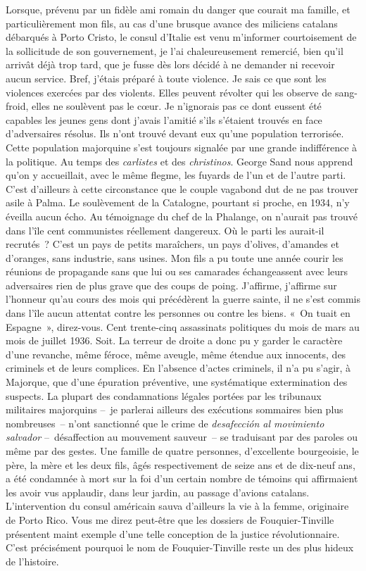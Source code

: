 \documentclass[french,twoside]{book} %
\begin{document}
Lorsque, prévenu par un fidèle ami romain du danger que courait ma famille, et particulièrement mon fils, au cas d’une brusque avance des miliciens catalans débarqués à Porto Cristo, le consul d’Italie est venu m’informer courtoisement de la sollicitude de son gouvernement, je l’ai chaleureusement remercié, bien qu’il arrivât déjà trop tard, que je fusse dès lors décidé à ne demander ni recevoir aucun service. Bref, j’étais préparé à toute violence. Je sais ce que sont les violences exercées par des violents. Elles peuvent révolter qui les observe de sang-froid, elles ne soulèvent pas le cœur. Je n’ignorais pas ce dont eussent été capables les jeunes gens dont j’avais l’amitié s’ils s’étaient trouvés en face d’adversaires résolus. Ils n’ont trouvé devant eux qu’une population terrorisée. Cette population majorquine s’est toujours signalée par une grande indifférence à la politique. Au temps des \emph{carlistes} et des \emph{christinos}. George Sand nous apprend qu’on y accueillait, avec le même flegme, les fuyards de l’un et de l’autre parti. C’est d’ailleurs à cette circonstance que le couple vagabond dut de ne pas trouver asile à Palma. Le soulèvement de la Catalogne, pourtant si proche, en 1934, n’y éveilla aucun écho. Au témoignage du chef de la Phalange, on n’aurait pas trouvé dans l’île cent communistes réellement dangereux. Où le parti les aurait-il recrutés ? C’est un pays de petits maraîchers, un pays d’olives, d’amandes et d’oranges, sans industrie, sans usines. Mon fils a pu toute une année courir les réunions de propagande sans que lui ou ses camarades échangeassent avec leurs adversaires rien de plus grave que des coups de poing. J’affirme, j’affirme sur l’honneur qu’au cours des mois qui précédèrent la guerre sainte, il ne s’est commis dans l’île aucun attentat contre les personnes ou contre les biens. « On tuait en Espagne », direz-vous. Cent trente-cinq assassinats politiques du mois de mars au mois de juillet 1936. Soit. La terreur de droite a donc pu y garder le caractère d’une revanche, même féroce, même aveugle, même étendue aux innocents, des criminels et de leurs complices. En l’absence d’actes criminels, il n’a pu s’agir, à Majorque, que d’une épuration préventive, une systématique extermination des suspects. La plupart des condamnations légales portées par les tribunaux militaires majorquins – je parlerai ailleurs des exécutions sommaires bien plus nombreuses – n’ont sanctionné que le crime de \emph{desafección al movimiento salvador} – désaffection au mouvement sauveur – se traduisant par des paroles ou même par des gestes. Une famille de quatre personnes, d’excellente bourgeoisie, le père, la mère et les deux fils, âgés respectivement de seize ans et de dix-neuf ans, a été condamnée à mort sur la foi d’un certain nombre de témoins qui affirmaient les avoir vus applaudir, dans leur jardin, au passage d’avions catalans. L’intervention du consul américain sauva d’ailleurs la vie à la femme, originaire de Porto Rico. Vous me direz peut-être que les dossiers de Fouquier-Tinville présentent maint exemple d’une telle conception de la justice révolutionnaire. C’est précisément pourquoi le nom de Fouquier-Tinville reste un des plus hideux de l’histoire.\par
\end{document}

